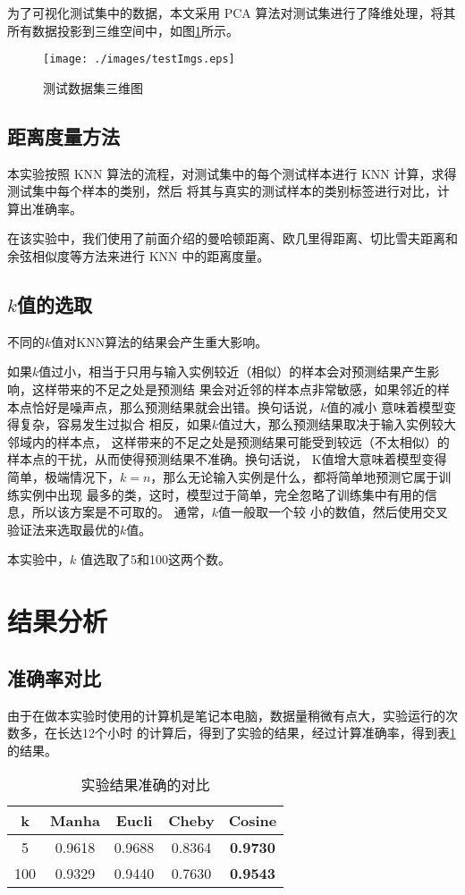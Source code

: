 \documentclass{cugrep}
\begin{document}
为了可视化测试集中的数据，本文采用 PCA 算法对测试集进行了降维处理，将其所有数据投影到三维空间中，如图\ref{fig:testImgs}所示。
\begin{figure}[htbp]
	\centering
    \texttt{[image: ./images/testImgs.eps]}
	\caption{测试数据集三维图}
	\label{fig:testImgs}
\end{figure}

\subsection{距离度量方法}
本实验按照 KNN 算法的流程，对测试集中的每个测试样本进行 KNN 计算，求得测试集中每个样本的类别，然后
将其与真实的测试样本的类别标签进行对比，计算出准确率。

在该实验中，我们使用了前面介绍的曼哈顿距离、欧几里得距离、切比雪夫距离和余弦相似度等方法来进行 KNN 中的距离度量。

\subsection{$k$值的选取}
不同的$k$值对KNN算法的结果会产生重大影响。

如果$k$值过小，相当于只用与输入实例较近（相似）的样本会对预测结果产生影响，这样带来的不足之处是预测结
果会对近邻的样本点非常敏感，如果邻近的样本点恰好是噪声点，那么预测结果就会出错。换句话说，$k$值的减小
意味着模型变得复杂，容易发生过拟合 相反，如果$k$值过大，那么预测结果取决于输入实例较大邻域内的样本点，
这样带来的不足之处是预测结果可能受到较远（不太相似）的样本点的干扰，从而使得预测结果不准确。换句话说，
K值增大意味着模型变得简单，极端情况下，$k = n$，那么无论输入实例是什么，都将简单地预测它属于训练实例中出现
最多的类，这时，模型过于简单，完全忽略了训练集中有用的信息，所以该方案是不可取的。 通常，$k$值一般取一个较
小的数值，然后使用交叉验证法来选取最优的$k$值。

本实验中，$k$ 值选取了5和100这两个数。

\section{结果分析}

\subsection{准确率对比}

由于在做本实验时使用的计算机是笔记本电脑，数据量稍微有点大，实验运行的次数多，在长达12个小时
的计算后，得到了实验的结果，经过计算准确率，得到表\ref{tb:err}的结果。
\begin{table}[htbp]
	\centering
	\begin{tabular}{ccccc}
		\toprule
		k  & Manha &  Eucli  & Cheby  & Cosine \\
		\midrule
		5   & 0.9618 & 0.9688 & 0.8364 & \bf{0.9730} \\
		100 & 0.9329 & 0.9440 & 0.7630 & \bf{0.9543} \\
		\bottomrule
	\end{tabular}
	\caption{实验结果准确的对比}
	\label{tb:err}
\end{table}
\end{document}
